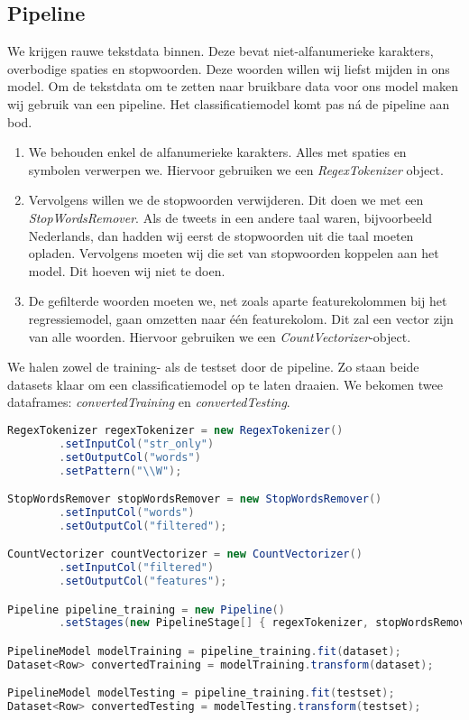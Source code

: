 \documentclass[a4paper,10pt,twoside]{report}
\begin{document}
\subsection*{Pipeline}

We krijgen rauwe tekstdata binnen. Deze bevat niet-alfanumerieke karakters, overbodige spaties en stopwoorden. Deze woorden willen wij liefst mijden in ons model. Om de tekstdata om te zetten naar bruikbare data voor ons model maken wij gebruik van een pipeline. Het classificatiemodel komt pas ná de pipeline aan bod.

\begin{enumerate}
	\item We behouden enkel de alfanumerieke karakters. Alles met spaties en symbolen verwerpen we. Hiervoor gebruiken we een \textit{RegexTokenizer} object.
	\item Vervolgens willen we de stopwoorden verwijderen. Dit doen we met een \textit{StopWordsRemover}. Als de tweets in een andere taal waren, bijvoorbeeld Nederlands, dan hadden wij eerst de stopwoorden uit die taal moeten opladen. Vervolgens moeten wij die set van stopwoorden koppelen aan het model. Dit hoeven wij niet te doen.
	\item De gefilterde woorden moeten we, net zoals aparte featurekolommen bij het regressiemodel, gaan omzetten naar één featurekolom. Dit zal een vector zijn van alle woorden. Hiervoor gebruiken we een \textit{CountVectorizer}-object.
\end{enumerate}

We halen zowel de training- als de testset door de pipeline. Zo staan beide datasets klaar om een classificatiemodel op te laten draaien. We bekomen twee dataframes: \textit{convertedTraining} en \textit{convertedTesting}.

\begin{lstlisting}[language=Java]
RegexTokenizer regexTokenizer = new RegexTokenizer()
		.setInputCol("str_only")
		.setOutputCol("words")
		.setPattern("\\W");

StopWordsRemover stopWordsRemover = new StopWordsRemover()
		.setInputCol("words")
		.setOutputCol("filtered");

CountVectorizer countVectorizer = new CountVectorizer()
		.setInputCol("filtered")
		.setOutputCol("features");

Pipeline pipeline_training = new Pipeline()
		.setStages(new PipelineStage[] { regexTokenizer, stopWordsRemover, countVectorizer });

PipelineModel modelTraining = pipeline_training.fit(dataset);
Dataset<Row> convertedTraining = modelTraining.transform(dataset);

PipelineModel modelTesting = pipeline_training.fit(testset);
Dataset<Row> convertedTesting = modelTesting.transform(testset);
\end{lstlisting}
\end{document}

